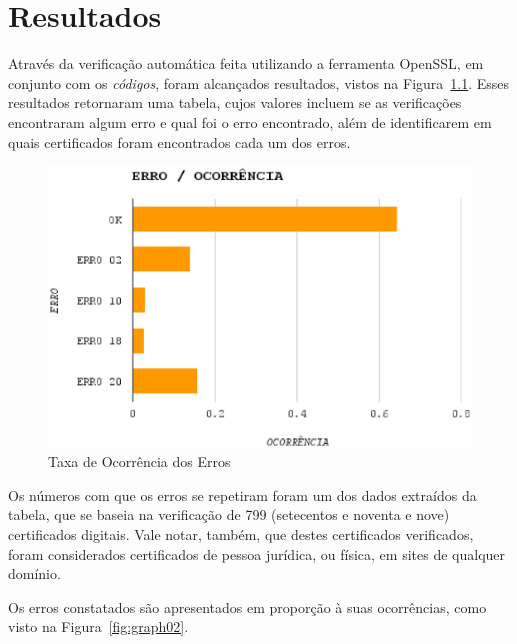 

\chapter[Resultados]{Resultados}

	Através da verificação automática feita utilizando a ferramenta OpenSSL, em conjunto com os \textit{códigos}, foram alcançados resultados, vistos na Figura~\ref{fig:graph01}. Esses resultados retornaram uma tabela, cujos valores incluem se as verificações encontraram algum erro e qual foi o erro encontrado, além de identificarem em quais certificados foram encontrados cada um dos erros.

	\begin{figure}[h]
		\centering
		\includegraphics[keepaspectratio=true,scale=0.6]{figuras/graph01.eps}
		\caption{Taxa de Ocorrência dos Erros}
		\label{fig:graph01}
	\end{figure}

	Os números com que os erros se repetiram foram um dos dados extraídos da tabela, que se baseia na verificação de 799 (setecentos e noventa e nove) certificados digitais. Vale notar, também, que destes certificados verificados, foram considerados certificados de pessoa jurídica, ou física, em sites de qualquer domínio.

	Os erros constatados são apresentados em proporção à suas ocorrências, como visto na Figura~\ref{fig:graph02}.

